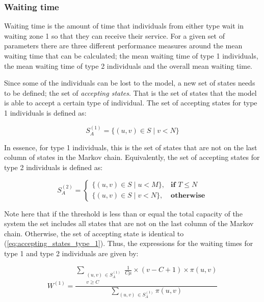 \subsubsection{Waiting time} \label{sec:waiting_time}

Waiting time is the amount of time that individuals from either type wait in 
waiting zone 1 so that they can receive their service. 
For a given set of parameters there are three different performance measures 
around the mean waiting time that can be calculated; the mean waiting time of
type 1 individuals, the mean waiting time of type 2 individuals and the 
overall mean waiting time. 

Since some of the individuals can be lost to the model, a new set of states 
needs to be defined; the set of \textit{accepting states}. 
That is the set of states that the model is able to accept a certain type of
individual. 
The set of accepting states for type 1 individuals is defined as:

\begin{equation}\label{eq:accepting_states_type_1}
    S_A^{(1)} = \{(u, v) \in S \; | \; v < N \}
\end{equation}

In essence, for type 1 individuals, this is the set of states that are not on 
the last column of states in the Markov chain.
Equivalently, the set of accepting states for type 2 individuals is defined as:

\begin{equation}\label{eq:accepting_states_type_2}
    S_A^{(2)}=
    \begin{cases}
        \{(u, v) \in S \; | \; u < M \}, & \textbf{if } T \leq N\\
        \{(u, v) \in S \; | \; v < N \}, & \textbf{otherwise}
    \end{cases}
\end{equation}

Note here that if the threshold is less than or equal the total capacity of the
system the set includes all states that are not on the last column of the 
Markov chain.
Otherwise, the set of accepting state is identical to 
(\ref{eq:accepting_states_type_1}). Thus, the expressions for the waiting times 
for type 1 and type 2 individuals are given by:

\begin{equation} \label{eq:closed_form_waiting_type_1}
    W^{(1)} = \frac{\sum_{\substack{(u,v) \, \in S_A^{(1)} \\ v \geq C}} 
    \frac{1}{C \mu} \times (v-C+1) \times \pi(u,v)}{\sum_{(u,v) \, 
    \in S_A^{(1)}} \pi(u,v)}
\end{equation}
    
